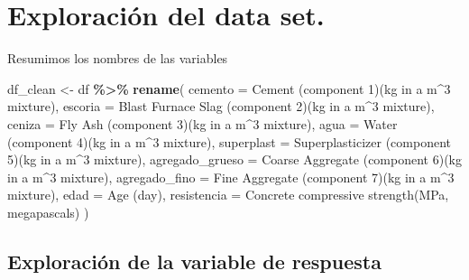 \documentclass[
]{book}
\newenvironment{Shaded}{\begin{snugshade}}{\end{snugshade}}
\newcommand{\AttributeTok}[1]{\textcolor[rgb]{0.13,0.29,0.53}{#1}}
\newcommand{\FunctionTok}[1]{\textcolor[rgb]{0.13,0.29,0.53}{\textbf{#1}}}
\newcommand{\NormalTok}[1]{#1}
\newcommand{\OtherTok}[1]{\textcolor[rgb]{0.56,0.35,0.01}{#1}}
\newcommand{\SpecialCharTok}[1]{\textcolor[rgb]{0.81,0.36,0.00}{\textbf{#1}}}
\newcommand{\StringTok}[1]{\textcolor[rgb]{0.31,0.60,0.02}{#1}}
\begin{document}
\section{Exploración del data set.}\label{exploraciuxf3n-del-data-set.}

Resumimos los nombres de las variables

\begin{Shaded}
\begin{Highlighting}[]
\NormalTok{df\_clean }\OtherTok{\textless{}{-}}\NormalTok{ df }\SpecialCharTok{\%\textgreater{}\%}
  \FunctionTok{rename}\NormalTok{(}
    \AttributeTok{cemento          =} \StringTok{\textasciigrave{}}\AttributeTok{Cement (component 1)(kg in a m\^{}3 mixture)}\StringTok{\textasciigrave{}}\NormalTok{,}
    \AttributeTok{escoria          =} \StringTok{\textasciigrave{}}\AttributeTok{Blast Furnace Slag (component 2)(kg in a m\^{}3 mixture)}\StringTok{\textasciigrave{}}\NormalTok{,}
    \AttributeTok{ceniza           =} \StringTok{\textasciigrave{}}\AttributeTok{Fly Ash (component 3)(kg in a m\^{}3 mixture)}\StringTok{\textasciigrave{}}\NormalTok{,}
    \AttributeTok{agua             =} \StringTok{\textasciigrave{}}\AttributeTok{Water  (component 4)(kg in a m\^{}3 mixture)}\StringTok{\textasciigrave{}}\NormalTok{,}
    \AttributeTok{superplast       =} \StringTok{\textasciigrave{}}\AttributeTok{Superplasticizer (component 5)(kg in a m\^{}3 mixture)}\StringTok{\textasciigrave{}}\NormalTok{,}
    \AttributeTok{agregado\_grueso  =} \StringTok{\textasciigrave{}}\AttributeTok{Coarse Aggregate  (component 6)(kg in a m\^{}3 mixture)}\StringTok{\textasciigrave{}}\NormalTok{,}
    \AttributeTok{agregado\_fino    =} \StringTok{\textasciigrave{}}\AttributeTok{Fine Aggregate (component 7)(kg in a m\^{}3 mixture)}\StringTok{\textasciigrave{}}\NormalTok{,}
    \AttributeTok{edad             =} \StringTok{\textasciigrave{}}\AttributeTok{Age (day)}\StringTok{\textasciigrave{}}\NormalTok{,}
    \AttributeTok{resistencia      =} \StringTok{\textasciigrave{}}\AttributeTok{Concrete compressive strength(MPa, megapascals)}\StringTok{\textasciigrave{}}
\NormalTok{  )}
\end{Highlighting}
\end{Shaded}

\subsection{Exploración de la variable de respuesta}\label{exploraciuxf3n-de-la-variable-de-respuesta}
\end{document}
